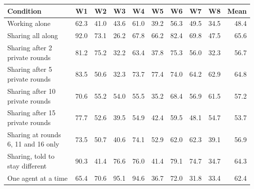 \begin{tabular}{l rrrrrrrr r}
\toprule
Condition & W1 & W2 & W3 & W4 & W5 & W6 & W7 & W8 & Mean \\
\midrule
Working alone & 62.3 & 41.0 & 43.6 & 61.0 & 39.2 & 56.3 & 49.5 & 34.5 & 48.4 \\
Sharing all along & 92.0 & 73.1 & 26.2 & 67.8 & 66.2 & 82.4 & 69.8 & 47.5 & 65.6 \\
Sharing after 2 private rounds & 81.2 & 75.2 & 32.2 & 63.4 & 37.8 & 75.3 & 56.0 & 32.3 & 56.7 \\
Sharing after 5 private rounds & 83.5 & 50.6 & 32.3 & 73.7 & 77.4 & 74.0 & 64.2 & 62.9 & 64.8 \\
Sharing after 10 private rounds & 70.6 & 55.2 & 54.0 & 55.5 & 35.2 & 68.4 & 56.9 & 61.5 & 57.2 \\
Sharing after 15 private rounds & 77.7 & 52.6 & 39.5 & 54.9 & 42.4 & 59.5 & 48.1 & 54.7 & 53.7 \\
Sharing at rounds 6, 11 and 16 only & 73.5 & 50.7 & 40.6 & 74.1 & 52.9 & 62.0 & 62.3 & 39.1 & 56.9 \\
Sharing, told to stay different & 90.3 & 41.4 & 76.6 & 76.0 & 41.4 & 79.1 & 74.7 & 34.7 & 64.3 \\
One agent at a time & 65.4 & 70.6 & 95.1 & 94.6 & 36.7 & 72.0 & 31.8 & 33.4 & 62.4 \\
\bottomrule
\end{tabular}